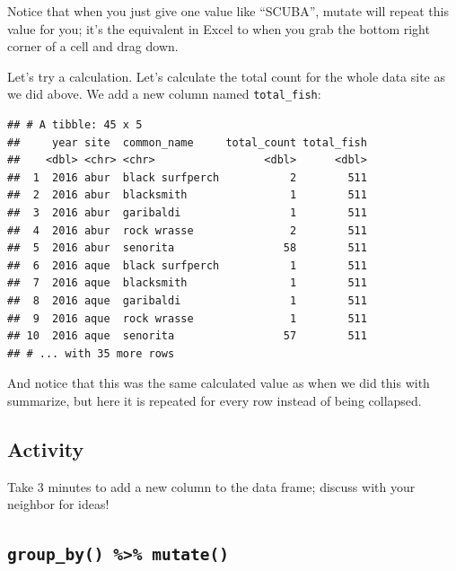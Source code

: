 \documentclass[]{book}
\newenvironment{Shaded}{\begin{snugshade}}{\end{snugshade}}
\newcommand{\DataTypeTok}[1]{\textcolor[rgb]{0.13,0.29,0.53}{#1}}
\newcommand{\KeywordTok}[1]{\textcolor[rgb]{0.13,0.29,0.53}{\textbf{#1}}}
\newcommand{\NormalTok}[1]{#1}
\newcommand{\OperatorTok}[1]{\textcolor[rgb]{0.81,0.36,0.00}{\textbf{#1}}}
\newcommand{\StringTok}[1]{\textcolor[rgb]{0.31,0.60,0.02}{#1}}
\begin{document}
Notice that when you just give one value like ``SCUBA'', mutate will repeat this value for you; it's the equivalent in Excel to when you grab the bottom right corner of a cell and drag down.

Let's try a calculation. Let's calculate the total count for the whole data site as we did above. We add a new column named \texttt{total\_fish}:

\begin{Shaded}
\end{Shaded}

\begin{verbatim}
## # A tibble: 45 x 5
##     year site  common_name     total_count total_fish
##    <dbl> <chr> <chr>                 <dbl>      <dbl>
##  1  2016 abur  black surfperch           2        511
##  2  2016 abur  blacksmith                1        511
##  3  2016 abur  garibaldi                 1        511
##  4  2016 abur  rock wrasse               2        511
##  5  2016 abur  senorita                 58        511
##  6  2016 aque  black surfperch           1        511
##  7  2016 aque  blacksmith                1        511
##  8  2016 aque  garibaldi                 1        511
##  9  2016 aque  rock wrasse               1        511
## 10  2016 aque  senorita                 57        511
## # ... with 35 more rows
\end{verbatim}

And notice that this was the same calculated value as when we did this with summarize, but here it is repeated for every row instead of being collapsed.

\hypertarget{activity}{%
\subsection{Activity}\label{activity}}

Take 3 minutes to add a new column to the data frame; discuss with your neighbor for ideas!

\hypertarget{group_by-mutate}{%
\subsection{\texorpdfstring{\texttt{group\_by()\ \%\textgreater{}\%\ mutate()}}{group\_by() \%\textgreater{}\% mutate()}}\label{group_by-mutate}}
\end{document}
